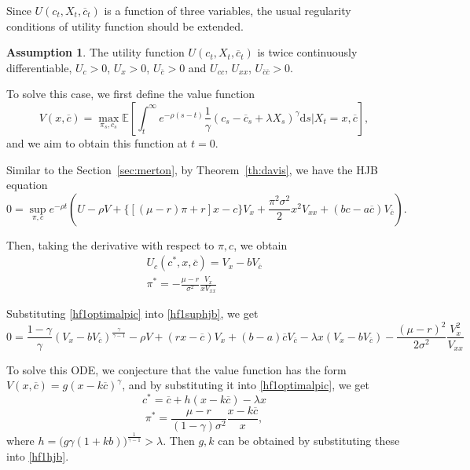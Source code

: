 \documentclass[a4paper]{article}
\theoremstyle{definition}
\newtheorem{assumption}[theorem]{Assumption}
\numberwithin{equation}{section}
\begin{document}
Since $U(c_t,X_t,\overline c_t)$ is a function of three variables, the usual regularity conditions of utility function should be extended.

\begin{assumption}
The utility function $U(c_t,X_t,\overline c_t)$ is twice continuously differentiable, $U_c>0$, $U_x>0$, $U_{\overline c}>0$ and $U_{cc}$, $U_{xx}$, $U_{\overline c\overline c}>0$.
\end{assumption}

To solve this case, we first define the value function
$$V(x,\overline c)=\max_{\pi_s,c_s}\mathbb E[\int^\infty_te^{-\rho(s-t)}\frac{1}{\gamma}(c_s-\overline c_s+\lambda X_s)^\gamma\mathrm ds\lvert X_t=x,\overline c],$$
and we aim to obtain this function at $t=0$.

Similar to the Section~\ref{sec:merton}, by Theorem~\ref{th:davis}, we have the HJB equation
\begin{equation}\label{hf1suphjb}
0=\sup_{\pi,c}e^{-\rho t}(U-\rho V+\{[(\mu-r)\pi+r]x-c\}V_x+\frac{\pi^2\sigma^2}{2}x^2V_{xx}+(bc-a\overline c)V_{\overline c}).
\end{equation}

Then, taking the derivative with respect to $\pi,c$, we obtain
\begin{equation}\label{hf1optimalpic}
\begin{aligned}
U_c(c^*,x,\overline c)=V_x-bV_{\overline c}\\
\pi^*=-\frac{\mu-r}{\sigma^2}\frac{V_x}{xV_{xx}}
\end{aligned}
\end{equation}

Substituting \eqref{hf1optimalpic} into \eqref{hf1suphjb}, we get
\begin{equation}\label{hf1hjb}
0=\frac{1-\gamma}{\gamma}(V_x-bV_{\overline c})^\frac{\gamma}{\gamma-1}-\rho V+(rx-\overline c)V_x+(b-a)\overline cV_{\overline c}-\lambda x(V_x-bV_{\overline c})-\frac{(\mu-r)^2}{2\sigma^2}\frac{V_x^2}{V_{xx}}
\end{equation}

To solve this ODE, we conjecture that the value function has the form $V(x,\overline c)=g(x-k\overline c)^\gamma$, and by substituting it into \eqref{hf1optimalpic}, we get
\begin{equation}\label{HF_c_optimal}
c^*=\overline c+h(x-k\overline c)-\lambda x
\end{equation}
\begin{equation}\label{HF_pi_optimal}
\pi^*=\frac{\mu-r}{(1-\gamma)\sigma^2}\frac{x-k\overline c}{x},
\end{equation}
where $h=\big(g\gamma(1+kb)\big)^\frac{1}{\gamma-1}>\lambda$. Then $g,k$ can be obtained by substituting these into \eqref{hf1hjb}.
\end{document}
